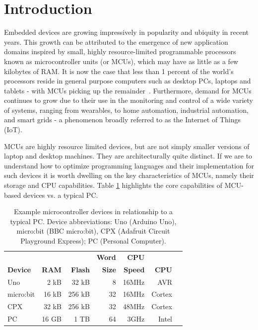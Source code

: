 \section{Introduction}
\label{sec:intro}

Embedded devices are growing impressively in popularity and ubiquity in recent years.
This growth can be attributed to the emergence of new application domains inspired by small,
highly resource-limited programmable processors known as microcontroller units (or MCUs),
which may have as little as a few kilobytes of RAM. It is now the case that less than 1 percent of
the world's processors reside in general purpose computers such as desktop PCs, laptops and tablets
- with MCUs picking up the remainder~\cite{borriello2000embedded}.
Furthermore, demand for MCUs continues to grow due to their use in the monitoring and
control of a wide variety of systems, ranging from wearables, to home automation,
industrial automation, and smart grids - a phenomenon broadly referred to as the Internet of Things (IoT).

MCUs are highly resource limited devices, but are not simply smaller versions of laptop and desktop machines.
They are architecturally quite distinct. If we are to understand how to optimize
programming languages and their implementation for such devices it is worth dwelling on the key characteristics of MCUs, namely their storage and CPU capabilities.
Table \ref{table:devices} highlights the core capabilities of MCU-based devices
vs. a typical PC.

\begin{table}[]
    \centering
    \begin{tabular}{|l|r|r|r|r|r|r|}
    \hline
                           &          &              & \bf{Word}  & \bf{CPU} &            \\
    \bf{Device}            & \bf{RAM} & \bf{Flash}   & \bf{Size}  & \bf{Speed} & \bf{CPU}  \\ \hline
    Uno            & 2 kB       & 32 kB      & 8          & 16MHz & AVR       \\ \hline
    micro:bit          & 16 kB      & 256 kB     & 32         & 16MHz & Cortex     \\ \hline
    CPX           & 32 kB      & 256 kB     & 32         & 48MHz & Cortex    \\ \hline
    PC             & 16 GB      & 1 TB       & 64         & 3GHz & Intel      \\ \hline
    \end{tabular}
    \caption{\label{table:devices}Example microcontroller devices in relationship to a typical PC. Device abbreviations: Uno (Arduino Uno), micro:bit (BBC micro:bit), CPX (Adafruit Circuit Playground Express); PC (Personal Computer).}
    \end{table}

